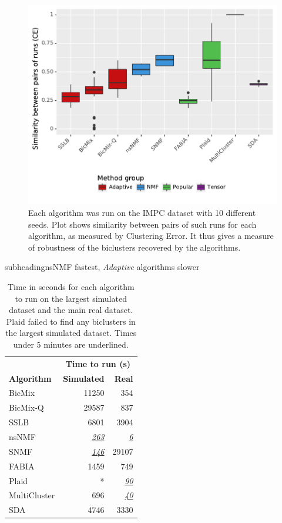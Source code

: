 \documentclass[xcolor=table,final]{beamer}
\newlength{\onecolwid}
\newlength{\twocolwid}
\newcommand{\runnerup}[1] {\underline{\textit{#1}}}
\newcommand{\kcnsubheading}[1]{\begin{beamercolorbox}[rounded=true]{subheading}{\large #1}\end{beamercolorbox}}
\begin{document}
\begin{frame}[t]
\begin{columns}[t]
\begin{column}{\twocolwid}
\begin{columns}
\begin{column}{\onecolwid}
\begin{figure}
\includegraphics[width=0.9 \textwidth]{plots/similarity_methods_K.pdf}
\caption{Each algorithm was run on the IMPC dataset with 10 different seeds. Plot shows similarity between pairs of such runs for each algorithm, as measured by Clustering Error. It thus gives a measure of robustness of the biclusters recovered by the algorithms.}
\end{figure}

\kcnsubheading{nsNMF fastest, \textit{Adaptive} algorithms slower}

\begin{table}[t!]
\caption{Time in seconds for each algorithm to run on the largest simulated dataset and the main real dataset. Plaid failed to find any biclusters in the largest simulated dataset. Times under 5 minutes are underlined.}

\begin{tabular}{ l | r | r }
    & \multicolumn{2}{c}{\textbf{Time to run (s)}} \\
    \textbf{Algorithm} & \textbf{Simulated} & \textbf{Real} \\ \hline
\cellcolor[HTML]{C50F11}\color[HTML]{FFFFFF}BicMix & 11250 & 354 \\
\cellcolor[HTML]{C50F11}\color[HTML]{FFFFFF}BicMix-Q & 29587 & 837 \\
\cellcolor[HTML]{C50F11}\color[HTML]{FFFFFF}SSLB & 6801 & 3904 \\ \hline
\cellcolor[HTML]{3B93DC}\color[HTML]{FFFFFF}nsNMF & \runnerup{263} & \runnerup{6} \\
\cellcolor[HTML]{3B93DC}\color[HTML]{FFFFFF}SNMF & \runnerup{146} & 29107 \\ \hline
\cellcolor[HTML]{50bd4c}\color[HTML]{FFFFFF}FABIA & 1459 & 749 \\
\cellcolor[HTML]{50bd4c}\color[HTML]{FFFFFF}Plaid & * & \runnerup{90} \\ \hline
\cellcolor[HTML]{7f1c8e}\color[HTML]{FFFFFF}MultiCluster & 696 & \runnerup{40} \\
\cellcolor[HTML]{7f1c8e}\color[HTML]{FFFFFF}SDA & 4746 & 3330 \\


\end{tabular}
\end{table}
\end{column}
\end{columns}
\end{column}
\end{columns}
\end{frame}
\end{document}
